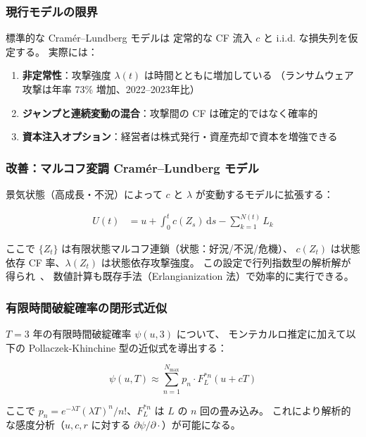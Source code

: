 \documentclass[a4paper,11pt]{article}
\newcommand{\ruin}{\psi}
\newcommand{\dd}{\mathrm{d}}
\theoremstyle{definition}
\begin{document}
\subsubsection{現行モデルの限界}

標準的な Cramér--Lundberg モデルは
定常的な CF 流入 $c$ と i.i.d. な損失列を仮定する。
実際には：
\begin{enumerate}[leftmargin=1.5em, itemsep=2pt]
  \item \textbf{非定常性}：攻撃強度 $\lambda(t)$ は時間とともに増加している
  （ランサムウェア攻撃は年率 73\% 増加、2022--2023年比）
  \item \textbf{ジャンプと連続変動の混合}：攻撃間の CF は確定的ではなく確率的
  \item \textbf{資本注入オプション}：経営者は株式発行・資産売却で資本を増強できる
\end{enumerate}

\subsubsection{改善：マルコフ変調 Cramér--Lundberg モデル}

景気状態（高成長・不況）によって $c$ と $\lambda$ が変動するモデルに拡張する：

\begin{align}
  U(t) &= u + \int_0^t c(Z_s)\, \dd s - \sum_{k=1}^{N(t)} L_k
  \label{eq:markov_ruin}
\end{align}

ここで $\{Z_t\}$ は有限状態マルコフ連鎖（状態：好況/不況/危機）、
$c(Z_t)$ は状態依存 CF 率、$\lambda(Z_t)$ は状態依存攻撃強度。
この設定で行列指数型の解析解が得られ~\cite{asmussen2010ruin}、
数値計算も既存手法（Erlangianization 法）で効率的に実行できる。

\subsubsection{有限時間破綻確率の閉形式近似}

$T = 3$ 年の有限時間破綻確率 $\ruin(u, 3)$ について、
モンテカルロ推定に加えて以下の Pollaczek-Khinchine 型の近似式を導出する：

\begin{equation}
  \ruin(u, T) \approx \sum_{n=1}^{N_{\max}} p_n \cdot F_{L}^{*n}(u + cT)
  \label{eq:finite_ruin}
\end{equation}

ここで $p_n = e^{-\lambda T}(\lambda T)^n / n!$、$F_L^{*n}$ は $L$ の $n$ 回の畳み込み。
これにより解析的な感度分析（$u, c, r$ に対する $\partial\ruin/\partial \cdot$）が可能になる。
\end{document}
